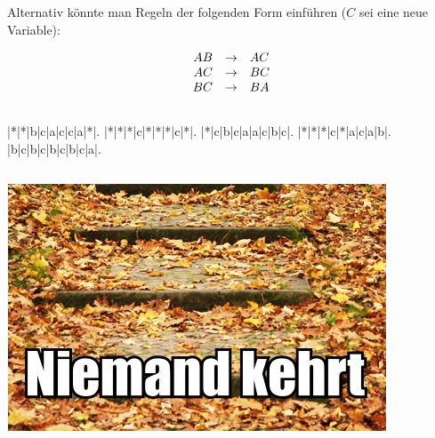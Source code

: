 \documentclass{article}
\begin{document}
Alternativ könnte man Regeln der folgenden Form einführen ($C$ sei eine neue
Variable):

\begin{equation*}
   \begin{array}{rcl}
      AB & \rightarrow & AC \\
      AC & \rightarrow & BC \\
      BC & \rightarrow & BA
   \end{array}
\end{equation*}

\subsection{} 

\hspace{1.8cm}\begin{minipage}{.4\textwidth}
   \def\PuzzleSolutionContent#1{\makebox(1,1){\itshape{#1}}}
   \renewcommand{\PuzzleLineThickness}{1pt}
   \PuzzleSolution
   \begin{Puzzle}{5}{9}
      |*|*|b|c|a|c|c|a|*|.
      |*|*|*|c|*|*|*|c|*|.
      |*|c|b|c|a|a|c|b|c|.
      |*|*|*|c|*|a|c|a|b|.
      |b|c|b|c|b|c|b|c|a|.
   \end{Puzzle}
\end{minipage}

\subsection{} 

\begin{center}
   \includegraphics{niemand_kehrt.jpeg}
\end{center}
\end{document}

